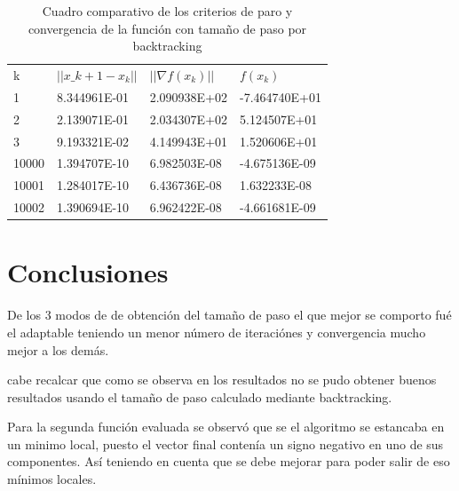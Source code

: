 \documentclass[journal]{IEEEtran}
\begin{document}
\begin{table}[H]
\begin{tabular}{@{}llll@{}}
k & $||x\_{k+1}-x_k||$ & $||\nabla f(x_k)||$ & $f(x_k)$ \\
1  &  8.344961E-01 &  2.090938E+02   &  -7.464740E+01  \\
2  &  2.139071E-01 &  2.034307E+02   &  5.124507E+01  \\
3  &  9.193321E-02 &  4.149943E+01   &  1.520606E+01  \\
10000  &  1.394707E-10 &  6.982503E-08   &  -4.675136E-09 \\
10001  &  1.284017E-10 &  6.436736E-08   &  1.632233E-08  \\
10002  &  1.390694E-10 &  6.962422E-08   &  -4.661681E-09
\end{tabular}
\caption{Cuadro comparativo de los criterios de paro y convergencia de la función con tamaño de paso por backtracking}
\end{table}

\section{Conclusiones}

De los 3 modos de de obtención del tamaño de paso el que mejor se comporto fué el adaptable teniendo un menor número de iteraciónes y convergencia mucho mejor a los demás.

cabe recalcar que como se observa en los resultados no se pudo obtener buenos resultados usando el tamaño de paso calculado mediante backtracking.

Para la segunda función evaluada se observó que se el algoritmo se estancaba en un minimo local, puesto el vector final contenía un signo negativo en uno de sus componentes. Así teniendo en cuenta que se debe mejorar para poder salir de eso mínimos locales.
\end{document}
